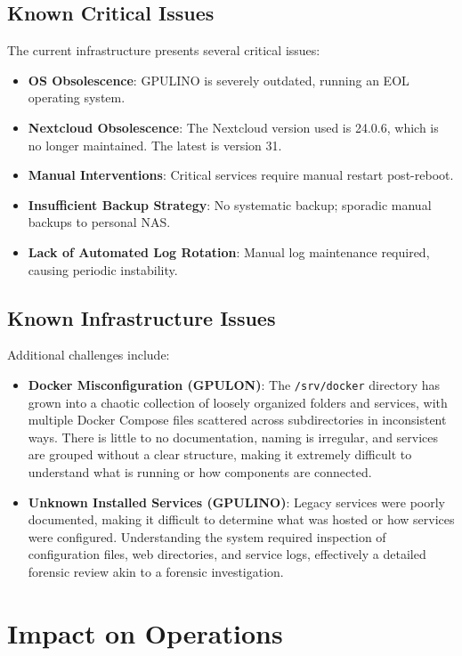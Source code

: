 \subsection{Known Critical Issues}

The current infrastructure presents several critical issues:
\begin{itemize}
  \item \textbf{OS Obsolescence}: GPULINO is severely outdated, running an EOL operating system.
  \item \textbf{Nextcloud Obsolescence}: The Nextcloud version used is 24.0.6, which is no longer maintained. The latest is version 31.
  \item \textbf{Manual Interventions}: Critical services require manual restart post-reboot.
  \item \textbf{Insufficient Backup Strategy}: No systematic backup; sporadic manual backups to personal NAS.
  \item \textbf{Lack of Automated Log Rotation}: Manual log maintenance required, causing periodic instability.
\end{itemize}

\subsection{Known Infrastructure Issues}

Additional challenges include:
\begin{itemize}
  \item \textbf{Docker Misconfiguration (GPULON)}: The \texttt{/srv/docker} directory has grown into a chaotic collection of loosely organized folders and services, with multiple Docker Compose files scattered across subdirectories in inconsistent ways. There is little to no documentation, naming is irregular, and services are grouped without a clear structure, making it extremely difficult to understand what is running or how components are connected.
  \item \textbf{Unknown Installed Services (GPULINO)}: Legacy services were poorly documented, making it difficult to determine what was hosted or how services were configured. Understanding the system required inspection of configuration files, web directories, and service logs, effectively a detailed forensic review akin to a forensic investigation.
\end{itemize}

\section{Impact on Operations}

